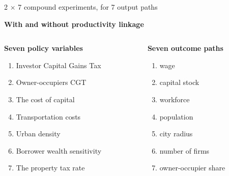 \documentclass[hide notes=show/only]{beamer} %
\begin{document}
\begin{frame}{2 $\times$ 7 compound experiments, for 7 output paths}

\hspace{-.3cm}\textbf{With and without productivity linkage}
\vspace{.5cm}
\begin{columns}
\begin{column}{0.5\textwidth}
\textbf{Seven policy variables}
\begin{enumerate}
\item Investor Capital Gains Tax
\item Owner-occupiers CGT

\item The cost of capital%
\item Transportation costs%
\item Urban density%
\item Borrower wealth sensitivity%
\item The property tax rate%
\end{enumerate}
\end{column}
\begin{column}{0.5\textwidth}
\textbf{Seven outcome paths}  
\begin{enumerate}
   \item wage \item capital stock\item workforce   \item population \item city radius \item  number of firms
\item owner-occupier share
\end{enumerate}
\end{column}
\end{columns}
\vspace{.3cm}

\end{frame}%
\end{document}
